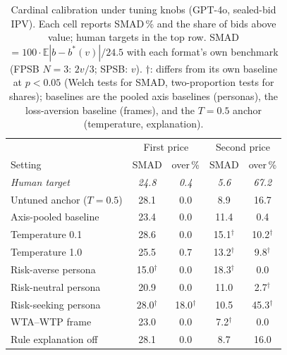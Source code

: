 \begin{table}[t]
\centering
\small
\caption{Cardinal calibration under tuning knobs (GPT-4o, sealed-bid IPV). Each cell reports SMAD\,\% and the share of bids above value; human targets in the top row. SMAD $=100\cdot\mathbb{E}|b-b^{*}(v)|/24.5$ with each format's own benchmark (FPSB $N{=}3$: $2v/3$; SPSB: $v$). $\dagger$: differs from its own baseline at $p<0.05$ (Welch tests for SMAD, two-proportion tests for shares); baselines are the pooled axis baselines (personas), the loss-aversion baseline (frames), and the $T{=}0.5$ anchor (temperature, explanation).}
\label{tab:cardinal}
\begin{tabular}{lcccc}
\toprule
& \multicolumn{2}{c}{First price} & \multicolumn{2}{c}{Second price} \\
Setting & SMAD & over\,\% & SMAD & over\,\% \\
\midrule
\emph{Human target} & \emph{24.8} & \emph{0.4} & \emph{5.6} & \emph{67.2} \\
\midrule
Untuned anchor ($T{=}0.5$)   & 28.1 & 0.0  & 8.9  & 16.7 \\
Axis-pooled baseline     & 23.4 & 0.0  & 11.4 & 0.4  \\
Temperature 0.1          & 28.6 & 0.0  & 15.1$^\dagger$ & 10.2$^\dagger$ \\
Temperature 1.0          & 25.5 & 0.7  & 13.2$^\dagger$ & 9.8$^\dagger$  \\
Risk-averse persona      & 15.0$^\dagger$ & 0.0 & 18.3$^\dagger$ & 0.0 \\
Risk-neutral persona     & 20.9 & 0.0 & 11.0 & 2.7$^\dagger$ \\
Risk-seeking persona     & 28.0$^\dagger$ & 18.0$^\dagger$ & 10.5 & 45.3$^\dagger$ \\
WTA--WTP frame           & 23.0 & 0.0  & 7.2$^\dagger$  & 0.0  \\
Rule explanation off     & 28.1 & 0.0  & 8.7  & 16.0 \\
\bottomrule
\end{tabular}
\end{table}

